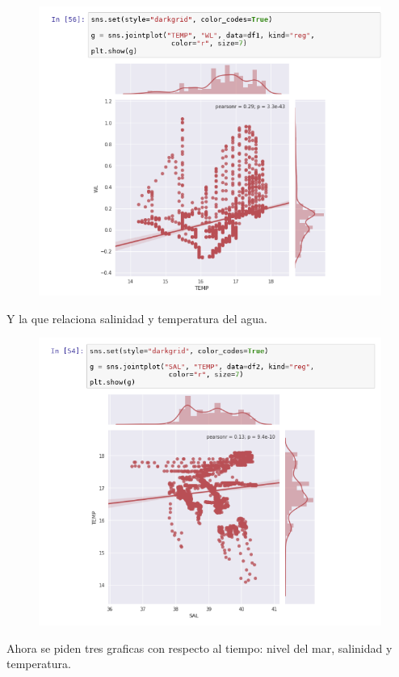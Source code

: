 \documentclass{article}
\begin{document}
\begin{figure}[H]
	\centering
    \includegraphics[width=\linewidth]{reg2.png}\\
\end{figure}
Y la que relaciona salinidad y temperatura del agua.
\begin{figure}[H]
	\centering
    \includegraphics[width=\linewidth]{reg3.png}\\
\end{figure}
Ahora se piden tres graficas con respecto al tiempo: nivel del mar, salinidad y temperatura.\\
\end{document}
